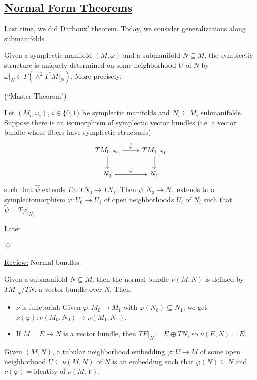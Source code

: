 \documentclass[x11names,reqno,14pt]{extarticle}
\begin{document}
\subsection*{\underline{Normal Form Theorems}}

Last time, we did Darboux' theorem. Today, we consider generalizations along submanifolds. 

Given a symplectic manifold $(M,\omega)$ and a submanifold $N \subseteq M$, the symplectic structure is uniquely determined on some neighborhood $U$ of $N$ by $\omega|_N \in \Gamma(\wedge^2T^*M|_N)$. More precisely:

\thm(``Master Theorem")

Let $(M_i,\omega_i)$, $i \in \{0,1\}$ be symplectic manifolds and $N_i \subseteq M_i$ submanifolds. Suppose there is an isomorphism of symplectic vector bundles (i.e. a vector bundle whose fibers have symplectic structures)
\[
\begin{tikzcd}
TM_0|_{N_0} \ar[r, "\hat{\psi}"] \ar[d] & TM_1|_{N_1} \ar[d] \\
N_0 \ar[r, "\psi"] & N_1
\end{tikzcd}
\]
such that $\hat{\psi}$ extends $T\psi:TN_0\to TN_1$. Then $\psi:N_0\to N_1$ extends to a symplectomorphism $\varphi:U_0\to U_1$ of open neighborhoods $U_i$ of $N_i$ such that $\tilde{\psi} = T\varphi|_{N_0}$

\proof

Later

\qed

\underline{Review:} Normal bundles. 

Given a submanifold $N \subseteq M$, then the normal bundle $\nu(M,N)$ is defined by $TM|_N/TN$, a vector bundle over $N$. Then:
\begin{itemize}

\item $\nu$ is functorial: Given $\varphi:M_0\to M_1$ with $\varphi(N_0) \subseteq N_1$, we get $\nu(\varphi): \nu(M_0,N_0) \to \nu(M_1,N_1)$.

\item If $M = E \to N$ is a vector bundle, then $TE|_N = E\oplus TN$, so $\nu(E,N) = E$.

\end{itemize}


 Given $(M,N)$, a \underline{tubular neighborhood embedding} $\varphi:U\to M$ of some open neighborhood $U \subseteq \nu(M,N)$ of $N$ is an embedding such that $\varphi(N) \subseteq N$ and $\nu(\varphi) = $identity of $\nu(M,V)$. 
\end{document}
